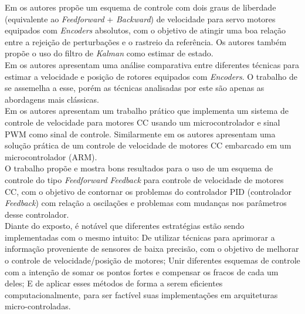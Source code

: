 Em \cite{TOF:PIControl} os autores propõe um esquema de controle com dois graus de liberdade (equivalente ao \emph{Feedforward} + \emph{Backward}) de velocidade para servo motores equipados com \emph{Encoders} absolutos, com o objetivo de atingir uma boa relação entre a rejeição de perturbações e o rastreio da referência. Os autores também propõe o uso do filtro de \emph{Kalman} como estimar de estado.\\

Em \cite{analise_incr_enc} os autores apresentam uma análise comparativa entre diferentes técnicas para estimar a velocidade e posição de rotores equipados com \emph{Encoders}. O trabalho de \cite{quantization_error01} se assemelha a esse, porém as técnicas analisadas por este são apenas as abordagens mais clássicas.\\

Em \cite{pwm_control} os autores apresentam um trabalho prático que implementa um sistema de controle de velocidade para motores CC usando um microcontrolador e sinal PWM como sinal de controle. Similarmente em \cite{embedded_control} os autores apresentam uma solução prática de um controle de velocidade de motores CC embarcado em um microcontrolador (ARM).\\

O trabalho \cite{feedback_feedforward_control01} propõe e mostra bons resultados para o uso de um esquema de controle do tipo \emph{Feedforward} \emph{Feedback} para controle de velocidade de motores CC, com o objetivo de contornar os problemas do controlador PID (controlador \emph{Feedback}) com relação a oscilações e problemas com mudanças nos parâmetros desse controlador.\\

Diante do exposto, é notável que diferentes estratégias estão sendo implementadas com o mesmo intuito: De utilizar técnicas para aprimorar a informação proveniente de sensores de baixa precisão, com o objetivo de melhorar o controle de velocidade/posição de motores; Unir diferentes esquemas de controle com a intenção de somar os pontos fortes e compensar os fracos de cada um deles; E de aplicar esses métodos de forma a serem eficientes computacionalmente, para ser factível suas implementações em arquiteturas micro-controladas.

